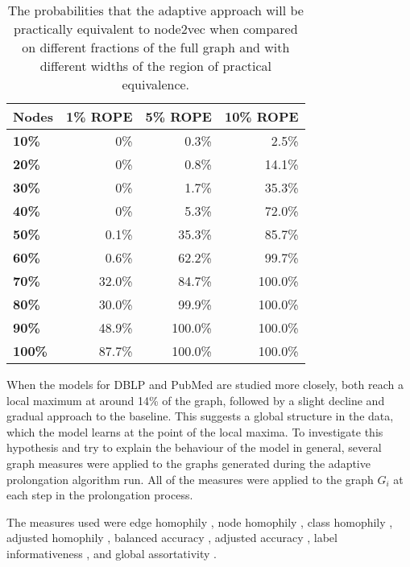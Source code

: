 \begin{table}
  \caption{The probabilities that the adaptive approach will be practically equivalent to node2vec when compared on different fractions of the full graph and with different widths of the region of practical equivalence.}
  \label{tab:bayesian-adaptive}
  \centering
  \begin{tabular}{lrrr}
    \toprule
    \textbf{Nodes} & \textbf{1\% ROPE} & \textbf{5\% ROPE} & \textbf{10\% ROPE} \\
    \midrule
    \textbf{10\%}  & 0\%               & 0.3\%             & 2.5\%              \\
    \textbf{20\%}  & 0\%               & 0.8\%             & 14.1\%             \\
    \textbf{30\%}  & 0\%               & 1.7\%             & 35.3\%             \\
    \textbf{40\%}  & 0\%               & 5.3\%             & 72.0\%             \\
    \textbf{50\%}  & 0.1\%             & 35.3\%            & 85.7\%             \\
    \textbf{60\%}  & 0.6\%             & 62.2\%            & 99.7\%             \\
    \textbf{70\%}  & 32.0\%            & 84.7\%            & 100.0\%            \\
    \textbf{80\%}  & 30.0\%            & 99.9\%            & 100.0\%            \\
    \textbf{90\%}  & 48.9\%            & 100.0\%           & 100.0\%            \\
    \textbf{100\%} & 87.7\%            & 100.0\%           & 100.0\%            \\
    \bottomrule
  \end{tabular}
\end{table}

When the models for DBLP and PubMed are studied more closely, both reach a local maximum at around 14\% of the graph, followed by a slight decline and gradual approach to the baseline. This suggests a global structure in the data, which the model learns at the point of the local maxima. To investigate this hypothesis and try to explain the behaviour of the model in general, several graph measures were applied to the graphs generated during the adaptive prolongation algorithm run. All of the measures were applied to the graph \( G_i \) at each step in the prolongation process.

The measures used were edge homophily \cite{zhu_beyond_2020}, node homophily \cite{pei_geom-gcn_2020}, class homophily \cite{lim_large_2021}, adjusted homophily \cite{platonov_characterizing_2022}, balanced accuracy \cite{platonov_characterizing_2022}, adjusted accuracy \cite{platonov_characterizing_2022}, label informativeness \cite{platonov_characterizing_2022}, and global assortativity \cite{newman_mixing_2003}.

